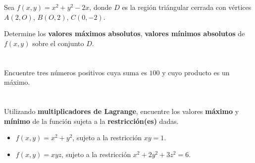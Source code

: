 \documentclass[12pt]{article}
\begin{document}
\section{}

Sea $f(x, y) = x^2 + y^2 − 2x$, donde $D$ es la región triángular cerrada con vértices $A(2, O)$, $B(O, 2)$, $C(0, -2)$.

Determine los \textbf{valores máximos absolutos}, \textbf{valores mínimos absolutos} de $f(x, y)$ sobre el conjunto $D$.

\section{}

Encuentre tres números positivos cuya suma es $100$ y cuyo producto es un máximo.

\section{}

Utilizando \textbf{multiplicadores de Lagrange}, encuentre los valores \textbf{máximo} y \textbf{mínimo} de la función sujeta a la \textbf{restricción(es)} dadas.

\begin{itemize}[format=\textbf]

\item $f(x, y) = x^2 + y^2$, sujeto a la restricción $xy = 1$.

\item $f(x, y) = xyz$, sujeto a la restricción $x^2 + 2y^2 + 3z^2 = 6$.
  
\end{itemize}
\end{document}
